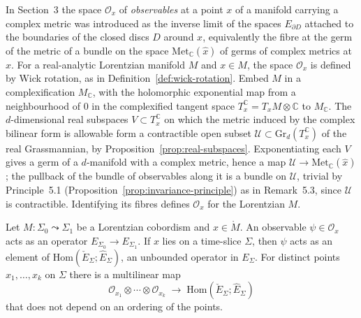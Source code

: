 \begin{definition}
  \label{def:observables}
  \leanok
  In Section~3 the space $\mathcal O_x$ of \emph{observables} at a point $x$ of a
  manifold carrying a complex metric was introduced as the inverse limit of the spaces
  $E_{\partial D}$ attached to the boundaries of the closed discs $D$ around $x$,
  equivalently the fibre at the germ of the metric of a bundle on the space
  $\mathrm{Met}_{\mathbb C}(\hat x)$ of germs of complex metrics at $x$. For a
  real-analytic Lorentzian manifold $M$ and $x \in M$, the space $\mathcal O_x$ is
  defined by Wick rotation, as in Definition~\ref{def:wick-rotation}. Embed $M$ in a
  complexification $M_{\mathbb C}$, with the holomorphic exponential map from a
  neighbourhood of $0$ in the complexified tangent space
  $T_x^{\mathbb C} = T_x M \otimes \mathbb C$ to $M_{\mathbb C}$. The $d$-dimensional
  real subspaces $V \subset T_x^{\mathbb C}$ on which the metric induced by the complex
  bilinear form is allowable form a contractible open subset
  $\mathcal U \subset \mathrm{Gr}_d(T_x^{\mathbb C})$ of the real Grassmannian, by
  Proposition~\ref{prop:real-subspaces}. Exponentiating each $V$ gives a germ of a
  $d$-manifold with a complex metric, hence a map
  $\mathcal U \to \mathrm{Met}_{\mathbb C}(\hat x)$; the pullback of the bundle of
  observables along it is a bundle on $\mathcal U$, trivial by Principle~5.1
  (Proposition~\ref{prop:invariance-principle}) as in Remark~5.3, since $\mathcal U$ is
  contractible. Identifying its fibres defines $\mathcal O_x$ for the Lorentzian $M$.
\end{definition}

\begin{proposition}
  \label{prop:observable-action}
  \notready
  Let $M \colon \Sigma_0 \leadsto \Sigma_1$ be a Lorentzian cobordism and
  $x \in \mathring M$. An observable $\psi \in \mathcal O_x$ acts as an operator
  $E_{\Sigma_0} \to E_{\Sigma_1}$. If $x$ lies on a time-slice $\Sigma$, then $\psi$
  acts as an element of $\mathrm{Hom}(\check E_{\Sigma}; \hat E_{\Sigma})$, an unbounded
  operator in $E_{\Sigma}$. For distinct points $x_1, \ldots, x_k$ on $\Sigma$ there is
  a multilinear map
  \[ \mathcal O_{x_1} \otimes \cdots \otimes \mathcal O_{x_k} \;\longrightarrow\;
     \mathrm{Hom}(\check E_{\Sigma}; \hat E_{\Sigma}) \]
  that does not depend on an ordering of the points.
\end{proposition}

